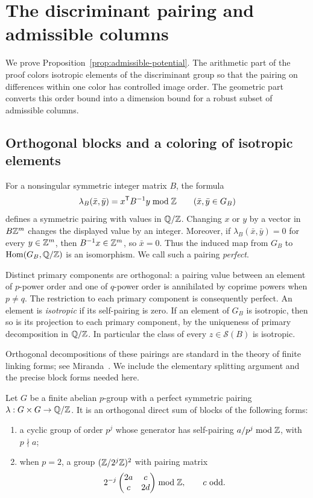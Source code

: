 \section{The discriminant pairing and admissible columns}\label{sec:discriminant}

We prove Proposition~\ref{prop:admissible-potential}. The arithmetic
part of the proof colors isotropic elements of the discriminant group
so that the pairing on differences within one color has controlled
image order. The geometric part converts this order bound into a
dimension bound for a robust subset of admissible columns.

\subsection{Orthogonal blocks and a coloring of isotropic elements}

For a nonsingular symmetric integer matrix \(B\), the formula
\[
 \lambda_B(\bar x,\bar y)=x^{\mathsf T}B^{-1}y\bmod\mathbb Z
 \qquad(\bar x,\bar y\in G_B)
\]
defines a symmetric pairing with values in \(\mathbb Q/\mathbb Z\).
Changing \(x\) or \(y\) by a vector in \(B\mathbb Z^m\) changes the displayed
value by an integer. Moreover, if \(\lambda_B(\bar x,\bar y)=0\) for
every \(y\in\mathbb Z^m\), then \(B^{-1}x\in\mathbb Z^m\), so \(\bar x=0\).
Thus the induced map from \(G_B\) to
\(\operatorname{Hom}(G_B,\mathbb Q/\mathbb Z)\) is an isomorphism. We call such a pairing
\emph{perfect}.

Distinct primary components are orthogonal: a pairing value between
an element of \(p\)-power order and one of \(q\)-power order is
annihilated by coprime powers when \(p\ne q\). The restriction to each
primary component is consequently perfect. An element is
\emph{isotropic} if its self-pairing is zero. If an element of \(G_B\)
is isotropic, then so is its projection to each primary component,
by the uniqueness of primary decomposition in \(\mathbb Q/\mathbb Z\).
In particular the class of every \(z\in\mathcal S(B)\) is isotropic.

Orthogonal decompositions of these pairings are standard in the theory
of finite linking forms; see Miranda~\cite[Section~1]{Miranda}.
We include the elementary splitting argument and the precise block
forms needed here.

\begin{lemma}\label{lem:discriminant-blocks}
Let \(G\) be a finite abelian \(p\)-group with a perfect symmetric
pairing \(\lambda:G\times G\to\mathbb Q/\mathbb Z\). It is an orthogonal
direct sum of blocks of the following forms:
\begin{enumerate}
 \item a cyclic group of order \(p^j\) whose generator has
 self-pairing \(a/p^j\bmod\mathbb Z\), with \(p\nmid a\);
 \item when \(p=2\), a group \((\mathbb Z/2^j\mathbb Z)^2\) with pairing matrix
 \[
  2^{-j}\begin{pmatrix}2a&c\\c&2d\end{pmatrix}\bmod\mathbb Z,
  \qquad c\ \text{odd}.
 \]
\end{enumerate}
\end{lemma}

